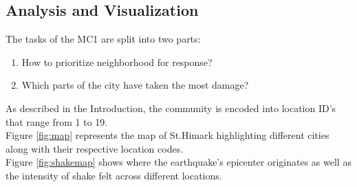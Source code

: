 \documentclass[12pt]{extarticle}
\begin{document}
 
\begin{centering}
	\section{Analysis and Visualization}
\end{centering}
The tasks of the MC1 are split into two parts: \\

\begin{enumerate}[itemsep=0mm]
	\item How to prioritize neighborhood for response?
	\item Which parts of the city have taken the most damage?
\end{enumerate}
\noindent
As described in the Introduction, the community is encoded into location ID's that range from 1 to 19.  \\
Figure \ref{fig:map} represents the map of St.Himark highlighting different cities along with their respective location codes. \\
Figure \ref{fig:shakemap} shows where the earthquake's epicenter originates as well as the intensity of shake felt across different locations. 
\end{document}
